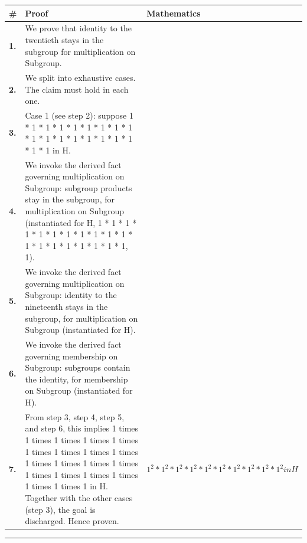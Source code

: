 \documentclass[11pt]{article}
\theoremstyle{definition}
\begin{document}
\begin{tabular}{@{} >{\raggedright\arraybackslash}p{} >{\raggedright\arraybackslash}p{} >{\raggedleft\arraybackslash}p{} @{}}
\textbf{\#} & \textbf{Proof} & \textbf{Mathematics} \\
\midrule
\textbf{1.} & We prove that identity to the twentieth stays in the subgroup for multiplication on Subgroup. & \\[0.45em]
\textbf{2.} & We split into exhaustive cases. The claim must hold in each one. & \\[0.45em]
\textbf{3.} & Case 1 (see step 2): suppose 1 * 1 * 1 * 1 * 1 * 1 * 1 * 1 * 1 * 1 * 1 * 1 * 1 * 1 * 1 * 1 * 1 * 1 * 1 in H. & \\[0.45em]
\textbf{4.} & We invoke the derived fact governing multiplication on Subgroup: subgroup products stay in the subgroup, for multiplication on Subgroup (instantiated for H, 1 * 1 * 1 * 1 * 1 * 1 * 1 * 1 * 1 * 1 * 1 * 1 * 1 * 1 * 1 * 1 * 1 * 1 * 1, 1). & \\[0.45em]
\textbf{5.} & We invoke the derived fact governing multiplication on Subgroup: identity to the nineteenth stays in the subgroup, for multiplication on Subgroup (instantiated for H). & \\[0.45em]
\textbf{6.} & We invoke the derived fact governing membership on Subgroup: subgroups contain the identity, for membership on Subgroup (instantiated for H). & \\[0.45em]
\textbf{7.} & From step 3, step 4, step 5, and step 6, this implies 1 times 1 times 1 times 1 times 1 times 1 times 1 times 1 times 1 times 1 times 1 times 1 times 1 times 1 times 1 times 1 times 1 times 1 times 1 times 1 in H. Together with the other cases (step 3), the goal is discharged. Hence proven. & $\displaystyle 1^{2} * 1^{2} * 1^{2} * 1^{2} * 1^{2} * 1^{2} * 1^{2} * 1^{2} * 1^{2} * 1^{2} in H$ \\[0.45em]
\bottomrule
\end{tabular}
\label{thm:Subgroup-multiplication-identity_to_the_twentieth_stays_in_the_subgroup}
\par\medskip\hrule
\end{document}
